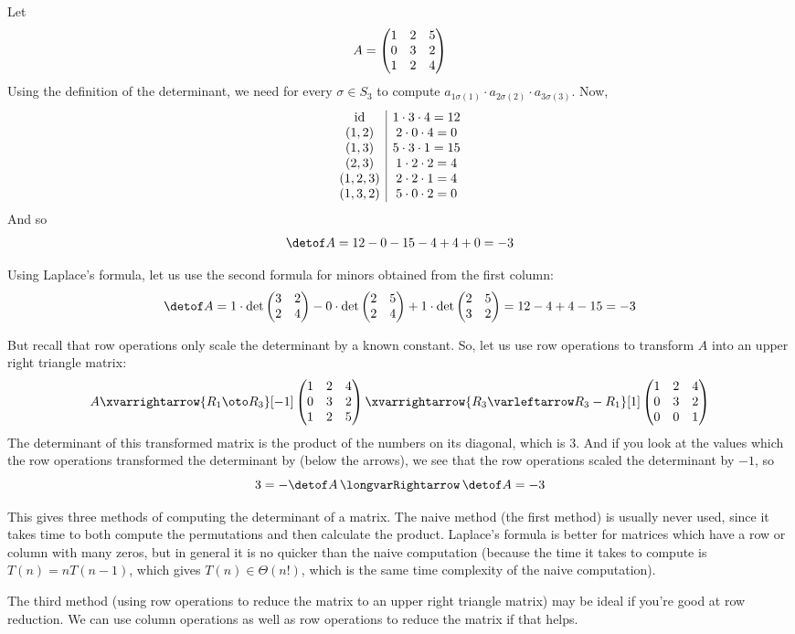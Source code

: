 \begin{exam*}

    Let
    \[ A = \begin{pmatrix}1 & 2 & 5 \\ 0 & 3 & 2 \\ 1 & 2 & 4\end{pmatrix} \]
    Using the definition of the determinant, we need for every $\sigma\in S_3$ to compute $a_{1\sigma(1)}\cdot a_{2\sigma(2)}\cdot a_{3\sigma(3)}$.
    Now,
    \[ \begin{array}{c|c}
    \mathrm{id} & 1\cdot3\cdot4=12 \\ 
    (1,2)& 2\cdot0\cdot4=0\\
    (1,3)& 5\cdot3\cdot1=15\\
    (2,3)& 1\cdot2\cdot2=4\\
    (1,2,3)& 2\cdot2\cdot1=4\\
    (1,3,2)& 5\cdot0\cdot2=0
    \end{array}
    \]
    And so
    \[ \detof A = 12 - 0 - 15 - 4 + 4 + 0 = -3 \]

    Using Laplace's formula, let us use the second formula for minors obtained from the first column:
    \[ \detof A = 1\cdot\det\pmat{3&2\\2&4} - 0\cdot\det\pmat{2&5\\2&4} + 1\cdot\det\pmat{2&5\\3&2} = 12-4 + 4-15 = -3 \]

    But recall that row operations only scale the determinant by a known constant.
    So, let us use row operations to transform $A$ into an upper right triangle matrix:
    \[ A\xvarrightarrow{R_1\oto R_3}[-1]\pmat{1 & 2 & 4 \\ 0 & 3 & 2 \\ 1 & 2 & 5}\xvarrightarrow{R_3\varleftarrow R_3-R_1}[1]\pmat{1&2&4 \\ 0&3&2 \\ 0&0&1} \]
    The determinant of this transformed matrix is the product of the numbers on its diagonal, which is $3$.
    And if you look at the values which the row operations transformed the determinant by (below the arrows), we see that the row operations scaled the determinant by $-1$, so
    \[ 3 = -\detof A \implies \detof A = -3 \]

    This gives three methods of computing the determinant of a matrix.
    The naive method (the first method) is usually never used, since it takes time to both compute the permutations and then calculate the product.
    Laplace's formula is better for matrices which have a row or column with many zeros, but in general it is no quicker than the naive computation (because the time it takes to compute is
    $T(n)=nT(n-1)$, which gives $T(n)\in\Theta(n!)$, which is the same time complexity of the naive computation).

    The third method (using row operations to reduce the matrix to an upper right triangle matrix) may be ideal if you're good at row reduction.
    We can use column operations as well as row operations to reduce the matrix if that helps.

\end{exam*}

